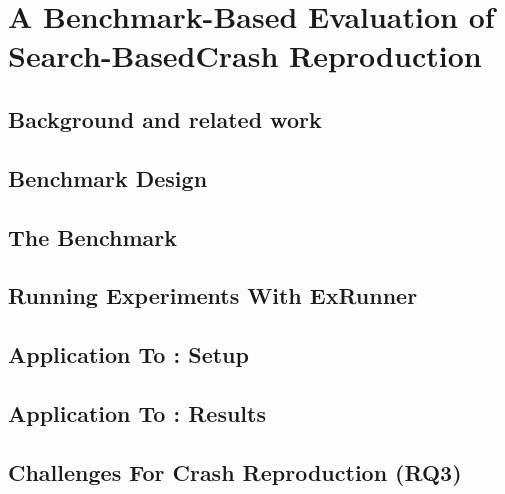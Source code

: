 \chapter{A Benchmark-Based Evaluation of Search-BasedCrash Reproduction}


\label{sec:jcrashpack:introduction}




\section{Background and related work}
\label{sec:jcrashpack:background}


\section{Benchmark Design}
\label{sec:jcrashpack:benchmarkdesign}


\section{The \crashpack Benchmark}
\label{sec:jcrashpack:benchmark}


\section{Running Experiments With ExRunner}
\label{sec:jcrashpack:ExRunner}


\section{Application To \evocrash: Setup}
\label{sec:jcrashpack:evocrashevalsetup}


\section{Application To \evocrash: Results}
\label{sec:jcrashpack:evocrashevalresults}


\section{Challenges For Crash Reproduction (RQ3)}
\label{sec:jcrashpack:challenges}


